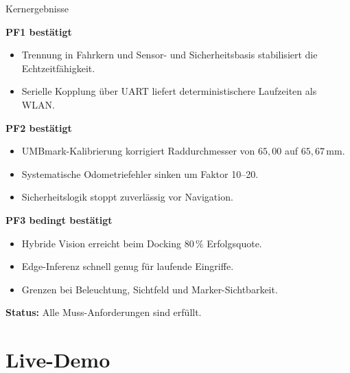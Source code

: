 \documentclass[aspectratio=169]{beamer}
\begin{document}
\begin{frame}{Kernergebnisse}

  \textbf{PF1 bestätigt}
  \begin{itemize}
    \item Trennung in Fahrkern und Sensor- und Sicherheitsbasis
          stabilisiert die Echtzeitfähigkeit.
    \item Serielle Kopplung über UART liefert deterministischere
          Laufzeiten als WLAN.
  \end{itemize}

  \vspace{0.4em}
  \textbf{PF2 bestätigt}
  \begin{itemize}
    \item UMBmark-Kalibrierung korrigiert Raddurchmesser von
          $65{,}00$ auf $65{,}67\,\mathrm{mm}$.
    \item Systematische Odometriefehler sinken um Faktor 10--20.
    \item Sicherheitslogik stoppt zuverlässig vor Navigation.
  \end{itemize}

  \vspace{0.4em}
  \textbf{PF3 bedingt bestätigt}
  \begin{itemize}
    \item Hybride Vision erreicht beim Docking $80\,\%$ Erfolgsquote.
    \item Edge-Inferenz schnell genug für laufende Eingriffe.
    \item Grenzen bei Beleuchtung, Sichtfeld und Marker-Sichtbarkeit.
  \end{itemize}

  \vspace{0.3em}
  \textbf{Status:} Alle Muss-Anforderungen sind erfüllt.

\end{frame}

\section{Live-Demo}
\end{document}
